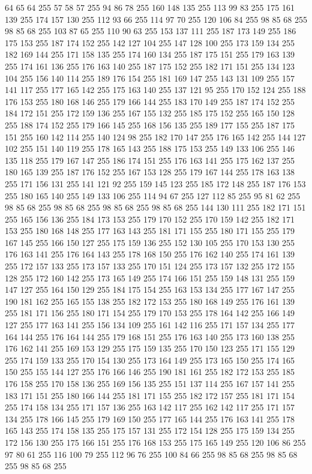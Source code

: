 64 65 64 255 57 58 57 255 94 86 78 255 160 148 135 255 113 99 83 255 175 161 139 255 174 157 130 255 112 93 66 255 114 97 70 255 120 106 84 255 98 85 68 255 98 85 68 255 103 87 65 255 110 90 63 255 153 137 111 255 187 173 149 255 186 175 153 255 187 174 152 255 142 127 104 255 147 128 100 255 173 159 134 255 182 169 144 255 171 158 135 255 174 160 134 255 187 175 151 255 179 163 139 255 174 161 136 255 176 163 140 255 187 175 152 255 182 171 151 255 134 123 104 255 156 140 114 255 189 176 154 255 181 169 147 255 143 131 109 255 157 141 117 255 177 165 142 255 175 163 140 255 137 121 95 255 170 152 124 255 188 176 153 255 180 168 146 255 179 166 144 255 183 170 149 255 187 174 152 255 184 172 151 255 172 159 136 255 167 155 132 255 185 175 152 255 165 150 128 255 188 174 152 255 179 166 145 255 168 156 135 255 189 177 155 255 187 175 151 255 160 142 114 255 140 124 98 255 182 170 147 255 176 165 142 255 144 127 102 255 151 140 119 255 178 165 143 255 188 175 153 255 149 133 106 255
146 135 118 255 179 167 147 255 186 174 151 255 176 163 141 255 175 162 137 255 180 165 139 255 187 176 152 255 167 153 128 255 179 167 144 255 178 163 138 255 171 156 131 255 141 121 92 255 159 145 123 255 185 172 148 255 187 176 153 255 180 165 140 255 149 133 106 255 114 94 67 255 127 112 85 255 95 81 62 255 98 85 68 255 98 85 68 255 98 85 68 255 98 85 68 255 144 130 111 255 182 171 151 255 165 156 136 255 184 173 153 255 179 170 152 255 170 159 142 255 182 171 153 255 180 168 148 255 177 163 143 255 181 171 155 255 180 171 155 255 179 167 145 255 166 150 127 255 175 159 136 255 152 130 105 255 170 153 130 255 176 163 141 255 176 164 143 255 178 168 150 255 176 162 140 255 174 161 139 255 172 157 133 255 173 157 133 255 170 151 124 255 173 157 132 255 172 155 128 255 172 160 142 255 173 165 149 255 174 166 151 255 159 148 131 255 159 147 127 255 164 150 129 255 184 175 154 255 163 153 134 255 177 167 147 255 190 181 162 255 165 155 138 255 182 172 153 255 180 168 149 255 176 161 139 255
181 171 156 255 180 171 154 255 179 170 153 255 178 164 142 255 166 149 127 255 177 163 141 255 156 134 109 255 161 142 116 255 171 157 134 255 177 164 144 255 176 164 144 255 179 168 151 255 176 163 140 255 173 160 138 255 176 162 141 255 169 153 129 255 175 159 135 255 170 150 123 255 171 155 129 255 174 159 133 255 170 154 130 255 173 164 149 255 173 165 150 255 174 165 150 255 155 144 127 255 176 166 146 255 190 181 161 255 182 172 153 255 185 176 158 255 170 158 136 255 169 156 135 255 151 137 114 255 167 157 141 255 183 171 151 255 180 166 144 255 181 171 155 255 182 172 157 255 181 171 154 255 174 158 134 255 171 157 136 255 163 142 117 255 162 142 117 255 171 157 134 255 178 166 145 255 179 169 150 255 177 165 144 255 176 163 141 255 178 165 143 255 174 158 135 255 175 157 131 255 172 154 128 255 175 159 134 255 172 156 130 255 175 166 151 255 176 168 153 255 175 165 149 255 120 106 86 255 97 80 61 255 116 100 79 255 112 96 76 255 100 84 66 255 98 85 68 255 98 85 68 255 98 85 68 255
